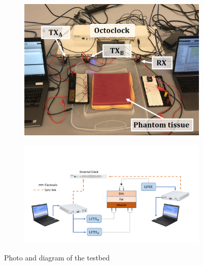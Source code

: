 \begin{figure}[h!]
\centering

    \begin{subfigure}[b]{0.35\textwidth}
        \centering
        \includegraphics[width=0.95\linewidth]{figures/GC_beamforming/testbed_labels.jpg}
        \label{F:testbed}
    \end{subfigure}%
    \begin{subfigure}[b]{0.6\textwidth}
        \centering
        \includegraphics[width=0.95\linewidth]{figures/GC_beamforming/testbed_schem.pdf}
        \label{F:testbed}
    \end{subfigure}
    \caption{Photo and diagram of the testbed}
    \label{F:testbed}
\end{figure}


